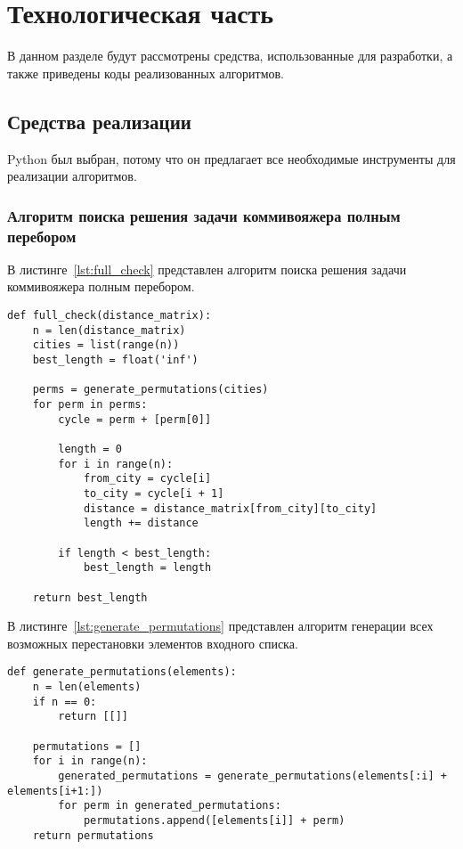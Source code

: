 \chapter{Технологическая часть}

В данном разделе будут рассмотрены средства, использованные для разработки, а также приведены коды реализованных алгоритмов.

\section{Средства реализации}

Python был выбран, потому что он предлагает все необходимые инструменты для реализации алгоритмов.


\subsection{Алгоритм поиска решения задачи коммивояжера полным перебором}

В листинге~\ref{lst:full_check} представлен алгоритм поиска решения задачи коммивояжера полным перебором.
\begin{center}
\begin{lstlisting}[caption={Алгоритм поиска решения задачи коммивояжера полным перебором}, label={lst:full_check}]
def full_check(distance_matrix):
    n = len(distance_matrix)
    cities = list(range(n))
    best_length = float('inf')

    perms = generate_permutations(cities)
    for perm in perms:
        cycle = perm + [perm[0]]

        length = 0
        for i in range(n):
            from_city = cycle[i]
            to_city = cycle[i + 1]
            distance = distance_matrix[from_city][to_city]
            length += distance

        if length < best_length:
            best_length = length

    return best_length
\end{lstlisting}
\end{center}

В листинге~\ref{lst:generate_permutations} представлен алгоритм генерации всех возможных перестановки элементов входного списка.
\begin{center}
\begin{lstlisting}[caption={Алгоритм генерации всех возможных перестановки элементов входного списка}, label={lst:generate_permutations}]
def generate_permutations(elements):
    n = len(elements)
    if n == 0:
        return [[]]

    permutations = []
    for i in range(n):
        generated_permutations = generate_permutations(elements[:i] + elements[i+1:])
        for perm in generated_permutations:
            permutations.append([elements[i]] + perm)
    return permutations
\end{lstlisting}
\end{center}

